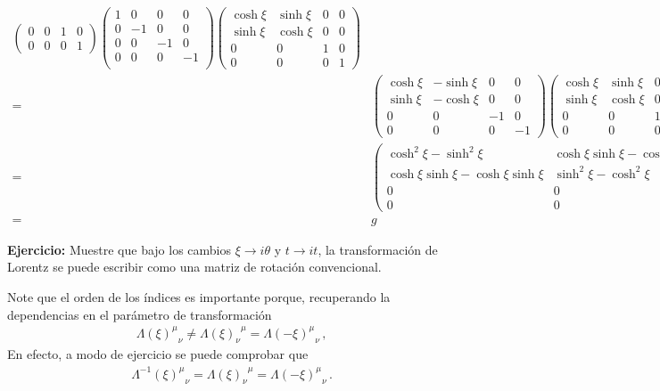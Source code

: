 \begin{frame}
\begin{align}
\begin{pmatrix}
    0     &  0  &1&0\\
    0     &  0  &0&1
  \end{pmatrix}
  \begin{pmatrix}
    1 & 0  & 0 &0\\
    0 & -1 & 0 &0\\
    0 & 0  & -1&0\\
    0 & 0  & 0 &-1\\
  \end{pmatrix}
  \begin{pmatrix}
    \cosh\xi&\sinh\xi&0&0\\
    \sinh\xi&\cosh\xi&0&0\\
    0     &  0  &1&0\\
    0     &  0  &0&1
  \end{pmatrix}\nonumber\\
  =&\begin{pmatrix}
       \cosh\xi&-\sinh\xi&0&0\\
    \sinh\xi&-\cosh\xi&0&0\\
    0     &  0  &-1&0\\
    0     &  0  &0&-1
  \end{pmatrix}
 \begin{pmatrix}
    \cosh\xi&\sinh\xi&0&0\\
    \sinh\xi&\cosh\xi&0&0\\
    0     &  0  &1&0\\
    0     &  0  &0&1
  \end{pmatrix}\nonumber\\
  =&\begin{pmatrix}
       \cosh^2\xi-\sinh^2\xi&\cosh\xi\sinh\xi-\cosh\xi\sinh\xi&0&0\\
    \cosh\xi\sinh\xi-\cosh\xi\sinh\xi&\sinh^2\xi-\cosh^2\xi&0&0\\
    0     &  0  &-1&0\\
    0     &  0  &0&-1
  \end{pmatrix}\nonumber\\
=&g
\end{align}
\end{frame}

\textbf{Ejercicio:} Muestre que bajo los cambios $\xi\to i\theta$ y $t\to it$, la transformación de Lorentz se puede escribir como una matriz de rotación convencional.

Note que el orden de los índices es importante porque, recuperando la dependencias en el parámetro de transformación
\begin{align}
  {\Lambda(\xi)^{\mu}}_{\nu}\ne {\Lambda(\xi)_{\nu}}^{\mu}={\Lambda(-\xi)^{\mu}}_{\nu}\,,
\end{align}
En efecto, a modo de ejercicio se puede comprobar que
\begin{align}
{\Lambda^{-1}(\xi)^{\mu}}_{\nu} ={\Lambda(\xi)_{\nu}}^{\mu}= {\Lambda(-\xi)^{\mu}}_{\nu}\,.
\end{align}


